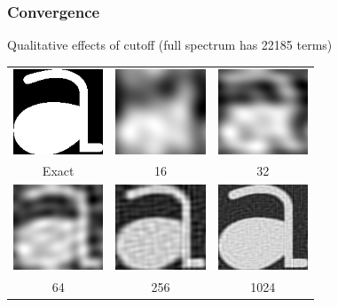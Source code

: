 \documentclass{beamer}
\begin{document}
\begin{frame}
\frametitle{Convergence}
Qualitative effects of cutoff (full spectrum has 22185 terms)
\begin{center}
\begin{tabular}{ccc}
\includegraphics[height=1in]{figures/trunc_exact.png} &
\includegraphics[height=1in]{figures/trunc_16.png} &
\includegraphics[height=1in]{figures/trunc_32.png} \\
Exact &
16 &
32 \\
\includegraphics[height=1in]{figures/trunc_64.png} &
\includegraphics[height=1in]{figures/trunc_256.png} &
\includegraphics[height=1in]{figures/trunc_1024.png} \\
64 &
256 &
1024 \\
\end{tabular}
\end{center}
\end{frame}
\end{document}
